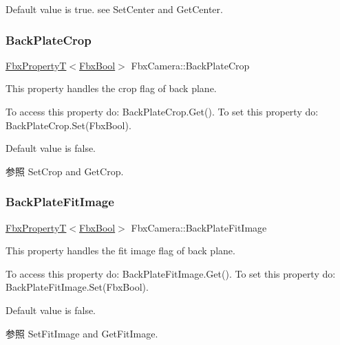 Default value is true. see Set\+Center and Get\+Center. \mbox{\label{class_fbx_camera_a3ec93b32631cf0b3bd2f41878c47a348}} 
\subsubsection{\texorpdfstring{Back\+Plate\+Crop}{BackPlateCrop}}
{\footnotesize\ttfamily \hyperlink{class_fbx_property_t}{Fbx\+PropertyT}$<$\hyperlink{fbxtypes_8h_a92e0562b2fe33e76a242f498b362262e}{Fbx\+Bool}$>$ Fbx\+Camera\+::\+Back\+Plate\+Crop}

This property handles the crop flag of back plane.

To access this property do\+: Back\+Plate\+Crop.\+Get(). To set this property do\+: Back\+Plate\+Crop.\+Set(\+Fbx\+Bool).

Default value is false. \begin{DoxySeeAlso}{参照}
Set\+Crop and Get\+Crop. 
\end{DoxySeeAlso}
\mbox{\label{class_fbx_camera_a60226ecc8df67faa201c77434eccd486}} 
\subsubsection{\texorpdfstring{Back\+Plate\+Fit\+Image}{BackPlateFitImage}}
{\footnotesize\ttfamily \hyperlink{class_fbx_property_t}{Fbx\+PropertyT}$<$\hyperlink{fbxtypes_8h_a92e0562b2fe33e76a242f498b362262e}{Fbx\+Bool}$>$ Fbx\+Camera\+::\+Back\+Plate\+Fit\+Image}

This property handles the fit image flag of back plane.

To access this property do\+: Back\+Plate\+Fit\+Image.\+Get(). To set this property do\+: Back\+Plate\+Fit\+Image.\+Set(\+Fbx\+Bool).

Default value is false. \begin{DoxySeeAlso}{参照}
Set\+Fit\+Image and Get\+Fit\+Image. 
\end{DoxySeeAlso}
\mbox{\label{class_fbx_camera_a4ee8a7a4e0c74fe8b76e83ee572a9b7c}} 

